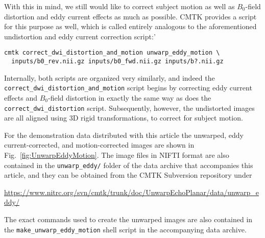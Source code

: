 \documentclass{InsightArticle}
\begin{document}
With this in mind, we still would like to correct subject motion as well as
$B_0$-field distortion and eddy current effects as much as possible. CMTK
provides a script for this purpose as well, which is called entirely analogous
to the aforementioned undistortion and eddy current correction script:'
\begin{verbatim}
cmtk correct_dwi_distortion_and_motion unwarp_eddy_motion \
  inputs/b0_rev.nii.gz inputs/b0_fwd.nii.gz inputs/b?.nii.gz
\end{verbatim}

Internally, both scripts are organized very similarly, and indeed the
\verb|correct_dwi_distortion_and_motion| script begins by correcting eddy
current effects and $B_0$-field distortion in exactly the same way as does the
\verb|correct_dwi_distortion| script. Subsequently, however, the undistorted
images are all aligned using 3D rigid transformations, to correct for subject
motion.

For the demonstration data distributed with this article the unwarped, eddy
current-corrected, and motion-corrected images are shown in
Fig.~\ref{fig:UnwarpEddyMotion}. The image files in NIFTI format are
also contained in the \verb|unwarp_eddy/| folder of the data archive that
accompanies this article, and they can be obtained from the CMTK Subversion
repository under

\centerline{\url{https://www.nitrc.org/svn/cmtk/trunk/doc/UnwarpEchoPlanar/data/unwarp_eddy/}}

The exact commands used to create the unwarped images are also contained in
the \verb|make_unwarp_eddy_motion| shell script in the accompanying data archive.
\end{document}
